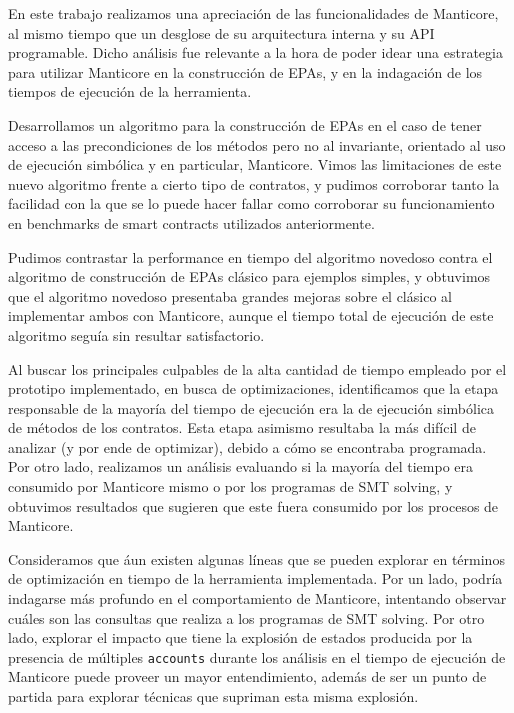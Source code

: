 En este trabajo realizamos una apreciación de las funcionalidades de Manticore, al mismo tiempo que un desglose de su arquitectura interna y su API programable.
Dicho análisis fue relevante a la hora de poder idear una estrategia para utilizar Manticore en la construcción de EPAs, y en la indagación de los tiempos de ejecución de la herramienta.

Desarrollamos un algoritmo para la construcción de EPAs en el caso de tener acceso a las precondiciones de los métodos pero no al invariante, orientado al uso de ejecución simbólica y en particular, Manticore.
Vimos las limitaciones de este nuevo algoritmo frente a cierto tipo de contratos, y pudimos corroborar tanto la facilidad con la que se lo puede hacer fallar como corroborar su funcionamiento en benchmarks de smart contracts utilizados anteriormente.

Pudimos contrastar la performance en tiempo del algoritmo novedoso contra el algoritmo de construcción de EPAs clásico para ejemplos simples, y obtuvimos que el algoritmo novedoso presentaba grandes mejoras sobre el clásico al implementar ambos con Manticore, aunque el tiempo total de ejecución de este algoritmo seguía sin resultar satisfactorio.

Al buscar los principales culpables de la alta cantidad de tiempo empleado por el prototipo implementado, en busca de optimizaciones, identificamos que la etapa responsable de la mayoría del tiempo de ejecución	era la de ejecución simbólica de métodos de los contratos.
Esta etapa asimismo resultaba la más difícil de analizar (y por ende de optimizar), debido a cómo se encontraba programada.
Por otro lado, realizamos un análisis evaluando si la mayoría del tiempo era consumido por Manticore mismo o por los programas de SMT solving, y obtuvimos resultados que sugieren que este fuera consumido por los procesos de Manticore.

Consideramos que áun existen algunas líneas que se pueden explorar en términos de optimización en tiempo de la herramienta implementada.
Por un lado, podría indagarse más profundo en el comportamiento de Manticore, intentando observar cuáles son las consultas que realiza a los programas de SMT solving.
Por otro lado, explorar el impacto que tiene la explosión de estados producida por la presencia de múltiples \texttt{accounts} durante los análisis en el tiempo de ejecución de Manticore puede proveer un mayor entendimiento, además de ser un punto de partida para explorar técnicas que supriman esta misma explosión.

